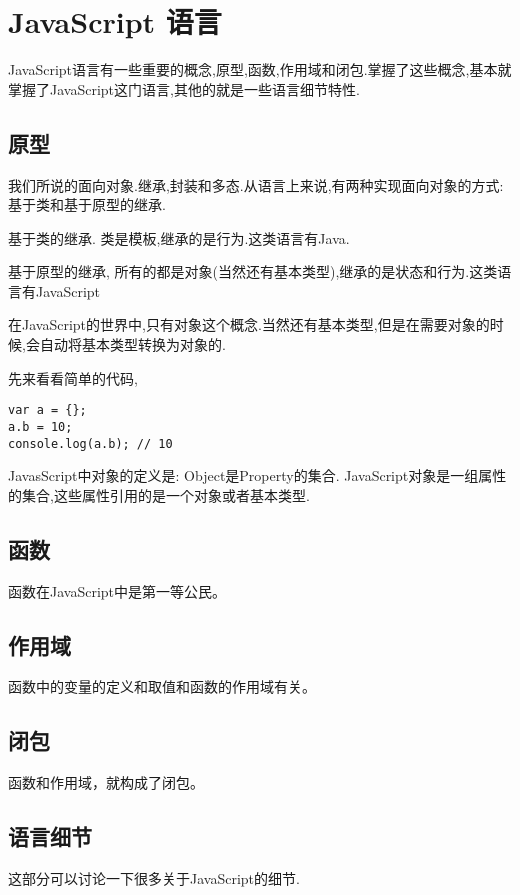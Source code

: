 \chapter{JavaScript 语言}
	JavaScript语言有一些重要的概念,原型,函数,作用域和闭包.掌握了这些概念,基本就掌握了JavaScript这门语言,其他的就是一些语言细节特性.
	\section{原型}
	我们所说的面向对象.继承,封装和多态.从语言上来说,有两种实现面向对象的方式:基于类和基于原型的继承.

	基于类的继承. 类是模板,继承的是行为.这类语言有Java.
	
	基于原型的继承, 所有的都是对象(当然还有基本类型),继承的是状态和行为.这类语言有JavaScript

	在JavaScript的世界中,只有对象这个概念.当然还有基本类型,但是在需要对象的时候,会自动将基本类型转换为对象的.

	先来看看简单的代码,

	\begin{lstlisting}
var a = {};	
a.b = 10;
console.log(a.b); // 10
	\end{lstlisting}

	JavasScript中对象的定义是: Object是Property的集合. JavaScript对象是一组属性的集合,这些属性引用的是一个对象或者基本类型.

	\section{函数}
	函数在JavaScript中是第一等公民。
	\section{作用域}
	函数中的变量的定义和取值和函数的作用域有关。
	\section{闭包}
	函数和作用域，就构成了闭包。
	\section{语言细节}
	这部分可以讨论一下很多关于JavaScript的细节.